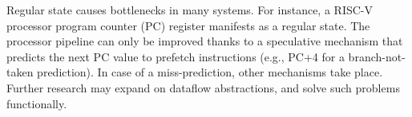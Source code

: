 Regular state causes bottlenecks in many systems. For instance, a RISC-V processor program counter (PC) register manifests as a regular state. The processor pipeline can only be improved thanks to a speculative mechanism that predicts the next PC value to prefetch instructions (e.g., PC+4 for a branch-not-taken prediction). In case of a miss-prediction, other mechanisms take place. Further research may expand on dataflow abstractions, and solve such problems functionally.






